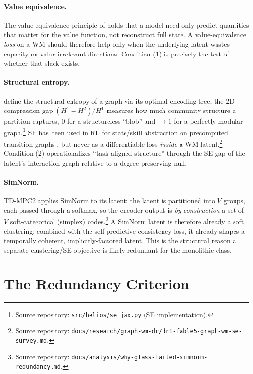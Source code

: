 \documentclass{article}
\begin{document}
\paragraph{Value equivalence.} The value-equivalence principle of \citet{grimm2020value} holds that a model need only predict quantities that matter for the value function, not reconstruct full state. A value-equivalence \emph{loss} on a WM should therefore help only when the underlying latent wastes capacity on value-irrelevant directions. Condition (1) is precisely the test of whether that slack exists.

\paragraph{Structural entropy.} \citet{li2016structural} define the structural entropy of a graph via its optimal encoding tree; the 2D compression gap $(H^1-H^2)/H^1$ measures how much community structure a partition captures, $0$ for a structureless ``blob'' and $\to 1$ for a perfectly modular graph.\footnote{Source repository: \texttt{src/helios/se\_jax.py} (SE implementation).} SE has been used in RL for state/skill abstraction on precomputed transition graphs \citep[SISA, SIDM, SI2E;][]{zeng2023sisa,zeng2024sidm,zeng2024si2e}, but never as a differentiable loss \emph{inside} a WM latent.\footnote{Source repository: \texttt{docs/research/graph-wm-dr/dr1-fable5-graph-wm-se-survey.md}.} Condition (2) operationalizes ``task-aligned structure'' through the SE gap of the latent's interaction graph relative to a degree-preserving null.

\paragraph{SimNorm.} TD-MPC2 applies SimNorm to its latent: the latent is partitioned into $V$ groups, each passed through a softmax, so the encoder output is \emph{by construction} a set of $V$ soft-categorical (simplex) codes.\footnote{Source repository: \texttt{docs/analysis/why-glass-failed-simnorm-redundancy.md}.} A SimNorm latent is therefore already a soft clustering; combined with the self-predictive consistency loss, it already shapes a temporally coherent, implicitly-factored latent. This is the structural reason a separate clustering/SE objective is likely redundant for the monolithic class.

\section{The Redundancy Criterion}
\label{sec:criterion}
\end{document}
